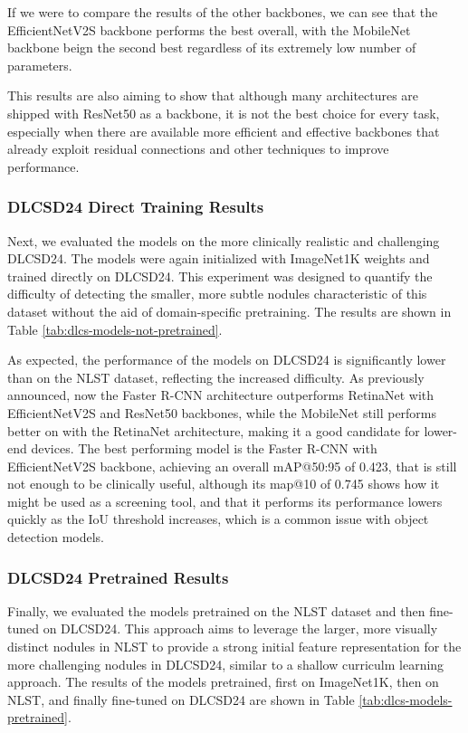 If we were to compare the results of the other backbones, we can see that the EfficientNetV2S backbone performs the best overall, with the MobileNet backbone beign the second best regardless of its extremely low number of parameters.

This results are also aiming to show that although many architectures are shipped with ResNet50 as a backbone, it is not the best choice for every task, especially when there are available more efficient and effective backbones that already exploit residual connections and other techniques to improve performance.

\subsubsection{DLCSD24 Direct Training Results}
Next, we evaluated the models on the more clinically realistic and challenging DLCSD24. The models were again initialized with ImageNet1K weights and trained directly on DLCSD24. This experiment was designed to quantify the difficulty of detecting the smaller, more subtle nodules characteristic of this dataset without the aid of domain-specific pretraining. The results are shown in Table \ref{tab:dlcs-models-not-pretrained}.



As expected, the performance of the models on DLCSD24 is significantly lower than on the NLST dataset, reflecting the increased difficulty. As previously announced, now the Faster R-CNN architecture outperforms RetinaNet with EfficientNetV2S and ResNet50 backbones, while the MobileNet still performs better on with the RetinaNet architecture, making it a good candidate for lower-end devices.
The best performing model is the Faster R-CNN with EfficientNetV2S backbone, achieving an overall mAP@50:95 of 0.423, that is still not enough to be clinically useful, although its map@10 of 0.745 shows how it might be used as a screening tool, and that it performs its performance lowers quickly as the IoU threshold increases, which is a common issue with object detection models.

\subsubsection{DLCSD24 Pretrained Results}
Finally, we evaluated the models pretrained on the NLST dataset and then fine-tuned on DLCSD24. This approach aims to leverage the larger, more visually distinct nodules in NLST to provide a strong initial feature representation for the more challenging nodules in DLCSD24, similar to a shallow curriculm learning approach.
The results of the models pretrained, first on ImageNet1K, then on NLST, and finally fine-tuned on DLCSD24 are shown in Table \ref{tab:dlcs-models-pretrained}.

